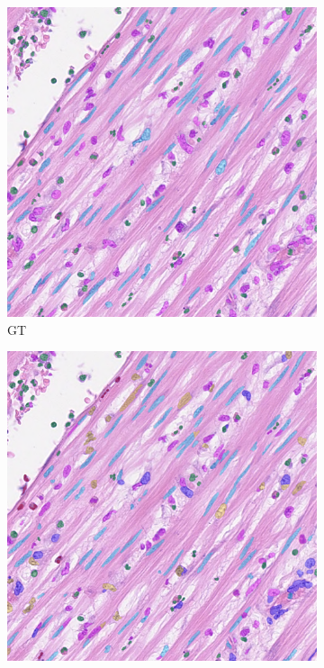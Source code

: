 \begin{figure}[H]
    \centering
    \begin{subfigure}[b]{0.3\textwidth}
    \includegraphics[width=\textwidth]{imgs/qual/consep/gt3.overlay.png}
    \caption{GT}
    \label{fig:consep-gt2}
  \end{subfigure}
  \begin{subfigure}[b]{0.3\textwidth}
    \includegraphics[width=\textwidth]{imgs/qual/consep/hov3.png}

\end{subfigure}
\end{figure}
